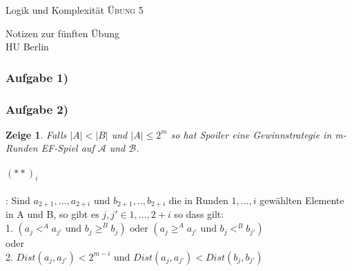 \documentclass[12pt]{article}
\newtheorem{zeige}{Zeige}
\begin{document}
\begin{center}
\Large
Logik und Komplexität  \textsc{ Übung 5 }
\end{center}

\begin{flushright}
Notizen zur fünften Übung\\
HU Berlin \\

\vspace{2 mm}

\end{flushright}

\subsubsection*{Aufgabe 1)}
\subsubsection*{Aufgabe 2)}
\begin{zeige}
  Falls $|A| < |B|$ und $|A| \leq 2^m$ so hat Spoiler eine Gewinnstrategie in m-Runden EF-Spiel auf $\mathcal{A}$ und $\mathcal{B}$.
\end{zeige}

\paragraph{$(**)_i$}: Sind $a_{2+1},...,a_{2+i}$ und $b_{2+1},..,b_{2+i}$ die in Runden $1, ..., i$ gewählten Elemente in A und B, so gibt es $j,j'\in {1,...,2+i}$ so dass gilt: \\
  1. $(a_j <^A a_{j'}\text{ und }b_j \geq^B b_j )\text{ oder }(a_j \geq^A a_{j'}\text{ und } b_j <^B b_{j'}) $\\
  oder\\
  2. $Dist(a_j,a_{j'})<2^{m-i}\text{ und } Dist(a_j,a_{j'})<Dist(b_j,b_{j'})$
\end{document}

